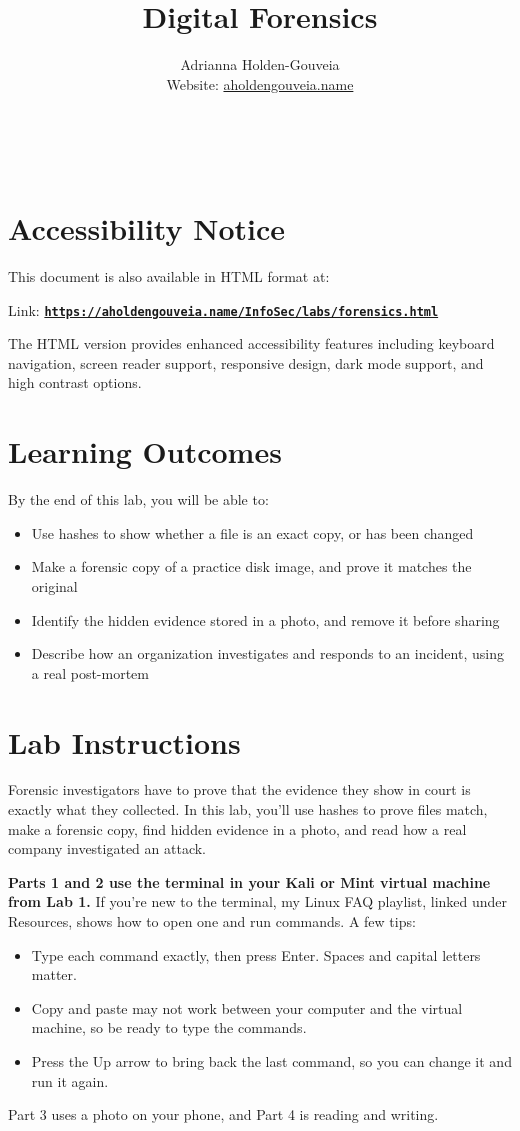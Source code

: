 \documentclass[12pt]{article}
\title{Digital Forensics}
\author{
        Adrianna Holden-Gouveia \\
        Website: \href{https://aholdengouveia.name}{aholdengouveia.name}\\ 
        \date{\vspace{-5ex}}
        \faGithub {: aholdengouveia} \\
        \faTwitter {: aholdengouveia} \\
        }
\begin{document}
\maketitle

\section*{Accessibility Notice}
This document is also available in HTML format at:

Link: \href{https://aholdengouveia.name/InfoSec/labs/forensics.html}{\textbf{\nolinkurl{https://aholdengouveia.name/InfoSec/labs/forensics.html}}}

The HTML version provides enhanced accessibility features including keyboard navigation, screen reader support, responsive design, dark mode support, and high contrast options.

\section*{Learning Outcomes}
By the end of this lab, you will be able to:
\begin{itemize}
    \item Use hashes to show whether a file is an exact copy, or has been changed
    \item Make a forensic copy of a practice disk image, and prove it matches the original
    \item Identify the hidden evidence stored in a photo, and remove it before sharing
    \item Describe how an organization investigates and responds to an incident, using a real post-mortem
\end{itemize}

\section*{Lab Instructions}
Forensic investigators have to prove that the evidence they show in court is exactly what they collected. In this lab, you'll use hashes to prove files match, make a forensic copy, find hidden evidence in a photo, and read how a real company investigated an attack.

\textbf{Parts 1 and 2 use the terminal in your Kali or Mint virtual machine from Lab 1.} If you're new to the terminal, my Linux FAQ playlist, linked under Resources, shows how to open one and run commands. A few tips:
\begin{itemize}
    \item Type each command exactly, then press Enter. Spaces and capital letters matter.
    \item Copy and paste may not work between your computer and the virtual machine, so be ready to type the commands.
    \item Press the Up arrow to bring back the last command, so you can change it and run it again.
\end{itemize}
Part 3 uses a photo on your phone, and Part 4 is reading and writing.
\end{document}
